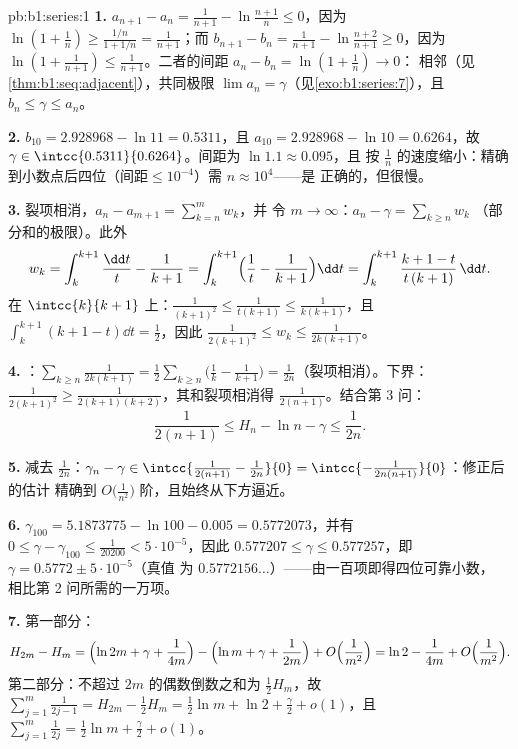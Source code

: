 \begin{solution}{pb:b1:series:1}
\textbf{1.} $a_{n+1} - a_n = \frac{1}{n+1} - \ln\frac{n+1}{n}
\leq 0$，因为 $\ln(1 + \frac1n) \geq \frac{1/n}{1 + 1/n} =
\frac{1}{n+1}$；而 $b_{n+1} - b_n = \frac{1}{n+1} -
\ln\frac{n+2}{n+1} \geq 0$，因为 $\ln(1 + \frac{1}{n+1}) \leq
\frac{1}{n+1}$。二者的间距 $a_n - b_n = \ln(1 + \frac1n) \to 0$：
相邻（见\cref{thm:b1:seq:adjacent}），共同极限 $\lim
a_n = \gamma$（见\cref{exo:b1:series:7}），且 $b_n \leq \gamma
\leq a_n$。

\textbf{2.} $b_{10} = 2.928968 - \ln 11 = 0.5311$，且 $a_{10} =
2.928968 - \ln 10 = 0.6264$，故 $\gamma \in
\intcc{0.5311}{0.6264}$。间距为 $\ln 1.1 \approx 0.095$，且
按 $\frac1n$ 的速度缩小：精确到小数点后四位（$\text{间距} \leq
10^{-4}$）需 $n \approx 10^4$——是
正确的，但很慢。

\textbf{3.} 裂项相消，$a_n - a_{m+1} = \sum_{k=n}^{m} w_k$，并
令 $m \to \infty$：$a_n - \gamma = \sum_{k\geq n} w_k$
（部分和的极限）。此外
\[
w_k = \int_k^{k+1} \frac{\dd t}{t} - \frac{1}{k+1}
= \int_k^{k+1} \Bigl(\frac1t - \frac{1}{k+1}\Bigr)\dd t
= \int_k^{k+1} \frac{k + 1 - t}{t\,(k+1)}\,\dd t .
\]
在 $\intcc{k}{k+1}$ 上：$\frac{1}{(k+1)^2} \leq \frac{1}{t(k+1)}
\leq \frac{1}{k(k+1)}$，且 $\int_k^{k+1}(k + 1 - t)\dd t =
\frac12$，因此 $\frac{1}{2(k+1)^2} \leq w_k \leq
\frac{1}{2k(k+1)}$。

\textbf{4.} ：$\sum_{k \geq n} \frac{1}{2k(k+1)} =
\frac12\sum_{k\geq n}\bigl(\frac1k - \frac{1}{k+1}\bigr) =
\frac{1}{2n}$（裂项相消）。下界：$\frac{1}{2(k+1)^2} \geq
\frac{1}{2(k+1)(k+2)}$，其和裂项相消得
$\frac{1}{2(n+1)}$。结合第 3 问：
\[
\frac{1}{2(n+1)} \leq H_n - \ln n - \gamma \leq \frac{1}{2n} .
\]

\textbf{5.} 减去 $\frac{1}{2n}$：$\gamma_n - \gamma \in
\intcc{\frac{1}{2(n+1)} - \frac{1}{2n}}{0} =
\intcc{-\frac{1}{2n(n+1)}}{0}$：修正后的估计
精确到 $O\bigl(\frac{1}{n^2}\bigr)$ 阶，且始终从下方逼近。

\textbf{6.} $\gamma_{100} = 5.1873775 - \ln 100 - 0.005 =
0.5772073$，并有 $0 \leq \gamma - \gamma_{100} \leq
\frac{1}{20200} < 5\cdot10^{-5}$，因此 $0.577207 \leq \gamma
\leq 0.577257$，即 $\gamma = 0.5772 \pm 5\cdot10^{-5}$（真值
为 $0.5772156\dots$）——由一百项即得四位可靠小数，
相比第 2 问所需的一万项。

\textbf{7.} 第一部分：
\[
H_{2m} - H_m = \Bigl(\ln 2m + \gamma + \frac{1}{4m}\Bigr)
- \Bigl(\ln m + \gamma + \frac{1}{2m}\Bigr) +
O\Bigl(\frac{1}{m^2}\Bigr)
= \ln 2 - \frac{1}{4m} + O\Bigl(\frac{1}{m^2}\Bigr).
\]
第二部分：不超过 $2m$ 的偶数倒数之和为 $\frac12 H_m$，故
$\sum_{j=1}^{m}\frac{1}{2j-1} = H_{2m} - \frac12 H_m = \frac12
\ln m + \ln 2 + \frac\gamma2 + o(1)$，且 $\sum_{j=1}^m
\frac{1}{2j} = \frac12\ln m + \frac\gamma2 + o(1)$。


\end{solution}
